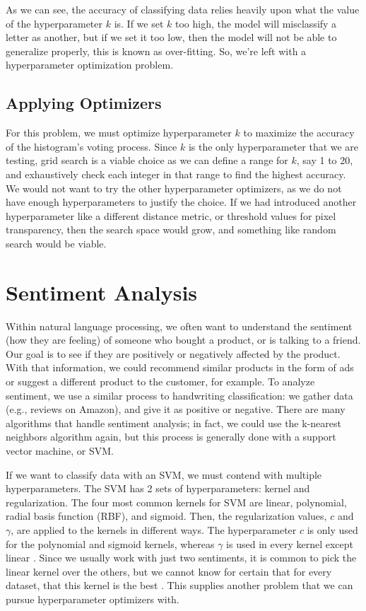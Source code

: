 \documentclass[stu,12pt,floatsintext]{apa7}
\begin{document}
As we can see, the accuracy of classifying data relies heavily upon what the value of the hyperparameter \(k\) is. If we set \(k\) too high, the model will misclassify a letter as another, but if we set it too low, then the model will not be able to generalize properly, this is known as over-fitting. So, we're left with a hyperparameter optimization problem.

\subsection{Applying Optimizers}

For this problem, we must optimize hyperparameter \(k\) to maximize the accuracy of the histogram's voting process. Since \(k\) is the only hyperparameter that we are testing, grid search is a viable choice as we can define a range for \(k\), say 1 to 20, and exhaustively check each integer in that range to find the highest accuracy. We would not want to try the other hyperparameter optimizers, as we do not have enough hyperparameters to justify the choice. If we had introduced another hyperparameter like a different distance metric, or threshold values for pixel transparency, then the search space would grow, and something like random search would be viable. 

\section{Sentiment Analysis}

Within natural language processing, we often want to understand the sentiment (how they are feeling) of someone who bought a product, or is talking to a friend. Our goal is to see if they are positively or negatively affected by the product. With that information, we could recommend similar products in the form of ads or suggest a different product to the customer, for example. To analyze sentiment, we use a similar process to handwriting classification: we gather data (e.g., reviews on Amazon), and give it as positive or negative. There are many algorithms that handle sentiment analysis; in fact, we could use the k-nearest neighbors algorithm again, but this process is generally done with a support vector machine, or SVM. 

If we want to classify data with an SVM, we must contend with multiple hyperparameters. The SVM has 2 sets of hyperparameters: kernel and regularization. The four most common kernels for SVM are linear, polynomial, radial basis function (RBF), and sigmoid. Then, the regularization values, \(c\) and \(\gamma\), are applied to the kernels in different ways. The hyperparameter \(c\) is only used for the polynomial and sigmoid kernels, whereas \(\gamma\) is used in every kernel except linear \parencite{jain_2024_svm}. Since we usually work with just two sentiments, it is common to pick the linear kernel over the others, but we cannot know for certain that for every dataset, that this kernel is the best \parencite{reddy_2023_sentiment}. This supplies another problem that we can pursue hyperparameter optimizers with.
\end{document}
